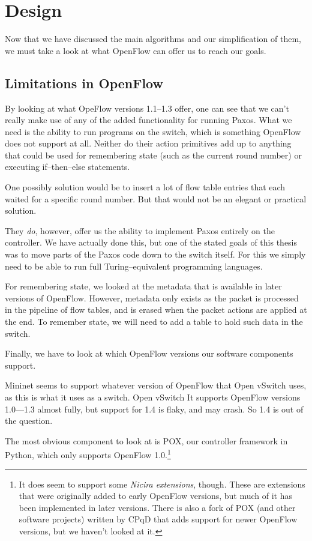 \chapter{Design}
\label{chapter:design}

Now that we have discussed the main algorithms and our simplification of
them, we must take a look at what OpenFlow can offer us to reach our goals.



\section{Limitations in OpenFlow}

By looking at what OpeFlow versions 1.1--1.3 offer, one can see that we can't really
make use of any of the added functionality for running Paxos.  What we need
is the ability to run programs on the switch, which is something OpenFlow
does not support at all.  Neither do their action primitives add up to
anything that could be used for remembering state (such as the current round
number) or executing if--then--else statements.

One possibly solution would be to insert a lot of flow table entries that
each waited for a specific round number.  But that would not be an elegant
or practical solution.

They \textit{do}, however, offer us the ability to implement Paxos entirely
on the controller.  We have actually done this, but one of the stated goals
of this thesis was to move parts of the Paxos code down to the switch
itself.  For this we simply need to be able to run full Turing--equivalent
programming languages.

For remembering state, we looked at the metadata that is available in later
versions of OpenFlow.  However, metadata only exists as the packet is
processed in the pipeline of flow tables, and is erased when the packet
actions are applied at the end.  To remember state, we will need to add a
table to hold such data in the switch.

Finally, we have to look at which OpenFlow versions our software components
support.

Mininet seems to support whatever version of OpenFlow that Open vSwitch uses,
as this is what it uses as a switch.  Open vSwitch It supports OpenFlow versions
1.0---1.3 almost fully, but support for 1.4 is flaky, and may crash.  So 1.4
is out of the question.

The most obvious component to look at is POX, our controller
framework in Python, which only supports OpenFlow 1.0.\footnote{It does seem
to support some \textit{Nicira extensions}, though.  These are extensions
that were originally added to early OpenFlow versions, but much of it
has been implemented in later versions.  There is also a fork of POX (and other
software projects) written by CPqD that adds support for newer OpenFlow
versions, but we haven't looked at it.}

